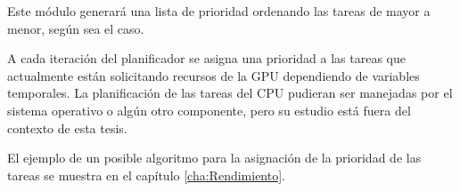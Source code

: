 Este módulo generará una lista de prioridad ordenando las tareas de mayor a menor, según sea el caso.

A cada iteración del planificador se asigna una prioridad a las tareas que actualmente están solicitando recursos de la GPU dependiendo de variables temporales. La planificación de las tareas del CPU pudieran ser manejadas por el sistema operativo o algún otro componente, pero su estudio está fuera del contexto de esta tesis.
\newline

El ejemplo de un posible algoritmo para la asignación de la prioridad de las tareas se muestra en el capítulo \ref{cha:Rendimiento}.